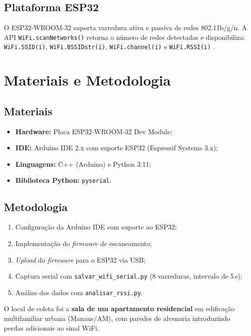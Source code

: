 \documentclass[
  12pt,
  a4paper,
  oneside,
  brazil,
  chapter=TITLE,
  section=TITLE,
]{abntex2}
\begin{document}
\section{Plataforma ESP32}

O ESP32-WROOM-32 suporta varredura ativa e passiva de redes 802.11b/g/n. A API
\texttt{WiFi.\allowbreak scanNetworks()} retorna o número de redes detectadas e
disponibiliza: \texttt{WiFi.SSID(i)}, \texttt{WiFi.BSSID\-str(i)},
\texttt{WiFi.channel(i)} e \texttt{WiFi.RSSI(i)} \cite{espressifwifi2023}.

\chapter{Materiais e Metodologia}

\section{Materiais}

\begin{itemize}
  \item \textbf{Hardware:} Placa ESP32-WROOM-32 Dev Module;
  \item \textbf{IDE:} Arduino IDE 2.x com suporte ESP32 (Espressif Systems 3.x);
  \item \textbf{Linguagens:} C++ (Arduino) e Python 3.11;
  \item \textbf{Biblioteca Python:} \texttt{pyserial}.
\end{itemize}

\section{Metodologia}

\begin{enumerate}
  \item Configuração da Arduino IDE com suporte ao ESP32;
  \item Implementação do \textit{firmware} de escaneamento;
  \item \textit{Upload} do \textit{firmware} para o ESP32 via USB;
  \item Captura serial com \texttt{salvar\_wifi\_serial.py} (8 varreduras,
        intervalo de 5\,s);
  \item Análise dos dados com \texttt{analisar\_rssi.py}.
\end{enumerate}

O local de coleta foi a \textbf{sala de um apartamento residencial} em
edificação multifamiliar urbana (Manaus/AM), com paredes de alvenaria
introduzindo perdas adicionais ao sinal WiFi.
\end{document}
